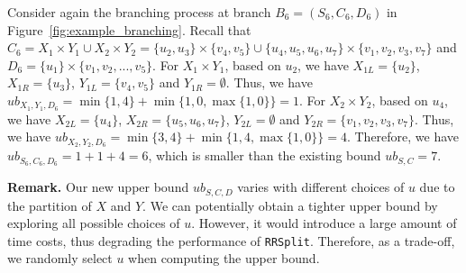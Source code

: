 \begin{example}
\label{example:upper_bound}
    Consider again the branching process at branch $B_6=(S_6,C_6,D_6)$ in Figure~\ref{fig:example_branching}. Recall that $C_6=X_1\times Y_1\cup X_2\times Y_2=\{u_2,u_3\}\times \{v_4,v_5\}\cup \{u_4,u_5,u_6,u_7\}\times \{v_1,v_2,v_3,v_7\}$ and $D_6=\{u_1\}\times\{v_1,v_2,...,v_5\}$. For $X_1\times Y_1$, based on $u_2$, 
    we have $X_{1L}=\{u_2\}$, $X_{1R}=\{u_3\}$, $Y_{1L}=\{v_4,v_5\}$ and $Y_{1R}=\emptyset$. Thus, we have $ub_{X_1,Y_1,D_6}=\min\{1,4\}+\min\{1,0,\max\{1,0\}\}=1$. For $X_2\times Y_2$, based on $u_4$, we have $X_{2L}=\{u_4\}$, $X_{2R}=\{u_5,u_6,u_7\}$, $Y_{2L}=\emptyset$ and $Y_{2R}=\{v_1,v_2,v_3,v_7\}$. Thus, we have $ub_{X_2,Y_2,D_6}=\min\{3,4\}+\min\{1,4,\max\{1,0\}\}=4$. Therefore, we have $ub_{S_6,C_6,D_6}=1+1+4=6$, which is smaller than the existing bound $ub_{S,C}=7$.
\end{example}

{\revision
\noindent\textbf{Remark.} Our new upper bound $ub_{S,C,D}$ varies {\chengE with} different choices of $u$ due to the partition of $X$ and $Y$. We can potentially obtain a tighter upper bound by exploring all possible choices of $u$. However, it {\chengE would} introduce a large amount of time costs, thus degrading the performance of \texttt{RRSplit}. Therefore, as a trade-off,  we randomly select $u$ when computing the upper bound.
}

